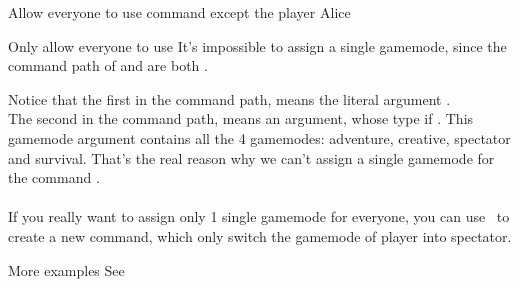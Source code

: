 \begin{example}{Allow everyone to use  command except the player Alice}
    \\
\end{example}

\begin{example}{Only allow everyone to use }
    It's impossible to assign a single gamemode, since the command path of  and  are both .

    Notice that the first  in the command path, means the literal argument .\\
    The second  in the command path, means an argument, whose type if .
    This gamemode argument contains all the 4 gamemodes: adventure, creative, spectator and survival.
    That's the real reason why we can't assign a single gamemode for the command .\\\\
    If you really want to assign only 1 single gamemode for everyone, you can use~ to create a new command, which only switch the gamemode of player into spectator.

\end{example}

\begin{example}{More examples}
    See~
\end{example}
